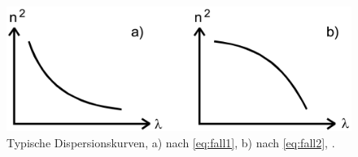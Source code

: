 \begin{figure}[h!tbp]
	\centering
	\includegraphics[width=0.7\linewidth]{dispersionskurven}
	\caption{Typische Dispersionskurven, a) nach \ref{eq:fall1}, b) nach \ref{eq:fall2}, \cite[7]{anleitungV402}.}
	\label{fig:dispersionskurven}
\end{figure}


